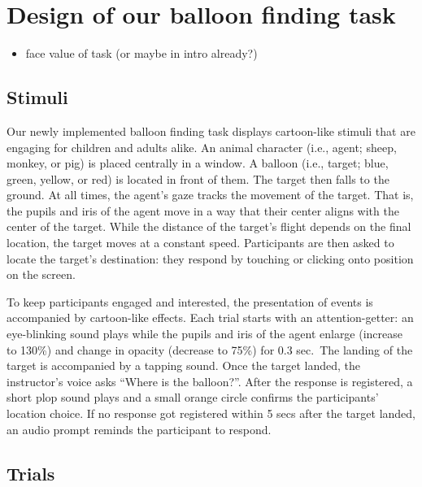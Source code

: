 \documentclass[
  man,floatsintext]{apa6}
\providecommand{\tightlist}{%
  \setlength{\itemsep}{0pt}\setlength{\parskip}{0pt}}
\begin{document}
\hypertarget{design-of-our-balloon-finding-task}{%
\section{Design of our balloon finding task}\label{design-of-our-balloon-finding-task}}

\begin{itemize}
\tightlist
\item
  face value of task (or maybe in intro already?)
\end{itemize}

\hypertarget{stimuli}{%
\subsection{Stimuli}\label{stimuli}}

Our newly implemented balloon finding task displays cartoon-like stimuli that are engaging for children and adults alike. An animal character (i.e., agent; sheep, monkey, or pig) is placed centrally in a window. A balloon (i.e., target; blue, green, yellow, or red) is located in front of them. The target then falls to the ground. At all times, the agent's gaze tracks the movement of the target. That is, the pupils and iris of the agent move in a way that their center aligns with the center of the target. While the distance of the target's flight depends on the final location, the target moves at a constant speed. Participants are then asked to locate the target's destination: they respond by touching or clicking onto position on the screen.

To keep participants engaged and interested, the presentation of events is accompanied by cartoon-like effects. Each trial starts with an attention-getter: an eye-blinking sound plays while the pupils and iris of the agent enlarge (increase to 130\%) and change in opacity (decrease to 75\%) for 0.3 sec.~The landing of the target is accompanied by a tapping sound. Once the target landed, the instructor's voice asks ``Where is the balloon?''. After the response is registered, a short plop sound plays and a small orange circle confirms the participants' location choice. If no response got registered within 5 secs after the target landed, an audio prompt reminds the participant to respond.

\hypertarget{trials}{%
\subsection{Trials}\label{trials}}
\end{document}
